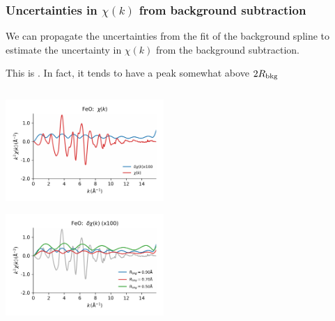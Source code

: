 \begin{frame}\frametitle{ Uncertainties in $\chi(k)$ from background subtraction}


\vmm
\begin{cenpage}{105mm}

  We can propagate the uncertainties from the fit of the background spline
  to estimate the uncertainty in $\chi(k)$ from the background subtraction.

  \vmm \vmm

  This is {}.   In fact, it tends to have a peak
  somewhat above $2 R_{\rm bkg}$
\end{cenpage}

\begin{columns}
  \begin{column}[T]{60mm}

    { { \includegraphics[width=60mm]{figs/errors/feo_chik_deltachi}}}

    { { \includegraphics[width=60mm]{figs/errors/feo_deltachik_rbkg} }}

    \end{column}

    \begin{column}[T]{60mm}

      {}
      {}


\end{column}
\end{columns}
\end{frame}
